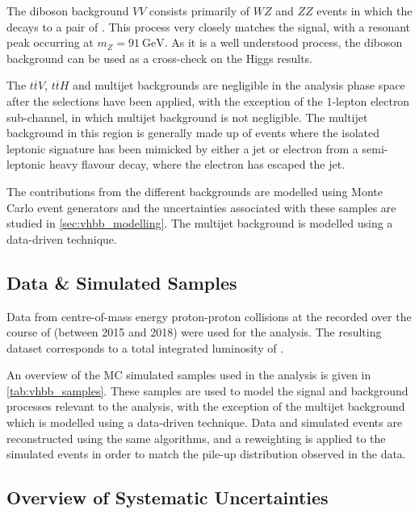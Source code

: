 The diboson background $VV$ consists primarily of $WZ$ and $ZZ$ events in which the \Zboson decays to a pair of \bquarks.
This process very closely matches the signal, with a resonant peak occurring at $m_Z = \SI{91}{\GeV}$.
As it is a well understood process, the diboson background can be used as a cross-check on the Higgs results.

The $t\overline{t} V$, $t\overline{t} H$ and multijet backgrounds are negligible in the analysis phase space after the selections have been applied, with the exception of the 1-lepton electron sub-channel, in which multijet background is not negligible.
The multijet background in this region is generally made up of events where the isolated leptonic signature has been mimicked by either a jet or electron from a semi-leptonic heavy flavour decay, where the electron has escaped the jet.

The contributions from the different backgrounds are modelled using Monte Carlo event generators and the uncertainties associated with these samples are studied in \cref{sec:vhbb_modelling}.
The multijet background is modelled using a data-driven technique.


\subsection{Data \& Simulated Samples}\label{sec:vhbb_samples}

Data from centre-of-mass energy  proton-proton collisions at the \LHC recorded over the course of \runtwo (between 2015 and
2018) were used for the analysis.
The resulting dataset corresponds to a total integrated luminosity of \intlumi.

An overview of the MC simulated samples used in the analysis is given in \cref{tab:vhbb_samples}.
These samples are used to model the signal and background processes relevant to the analysis, with the exception of the multijet background which is modelled using a data-driven technique.
Data and simulated events are reconstructed using the same algorithms, and a reweighting is applied to the simulated events in order to match the pile-up distribution
observed in the data.
%

%

\subsection{Overview of Systematic Uncertainties}\label{sec:systematic_uncertainties}

